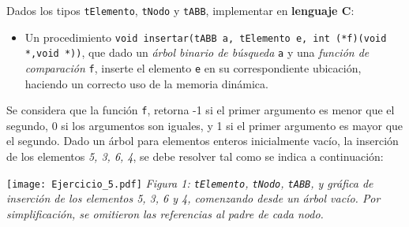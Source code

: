 \documentclass[12pt,a4paper]{article}
\begin{document}
 Dados los tipos \texttt{tElemento}, \texttt{tNodo} y \texttt{tABB}, implementar en \textbf{lenguaje C}: 
\begin{itemize}
	\item Un procedimiento \texttt{void insertar(tABB a, tElemento e, int (*f)(void *,void *))}, que dado un \textit{árbol binario de búsqueda} \texttt{a} y una \textit{función de comparación} \texttt{f}, inserte el elemento \texttt{e} en su correspondiente ubicación, haciendo un correcto uso de la memoria dinámica. 
\end{itemize}

Se considera que la función \texttt{f}, retorna -1 si el primer argumento es menor que el segundo, 0 si los argumentos son iguales, y 1 si el primer argumento es mayor que el segundo. Dado un árbol para elementos enteros inicialmente vacío, la inserción de los elementos \textit{5, 3, 6, 4}, se debe resolver tal como se indica a continuación: \\
\begin{center}
	\texttt{[image: Ejercicio\_5.pdf]}
	\textit{Figura 1: \texttt{tElemento}, \texttt{tNodo}, \texttt{tABB}, y gráfica de inserción de los elementos 5, 3, 6 y 4, comenzando desde un árbol vacío. Por simplificación, se omitieron las referencias al padre de cada nodo.}
\end{center}
\end{document}
